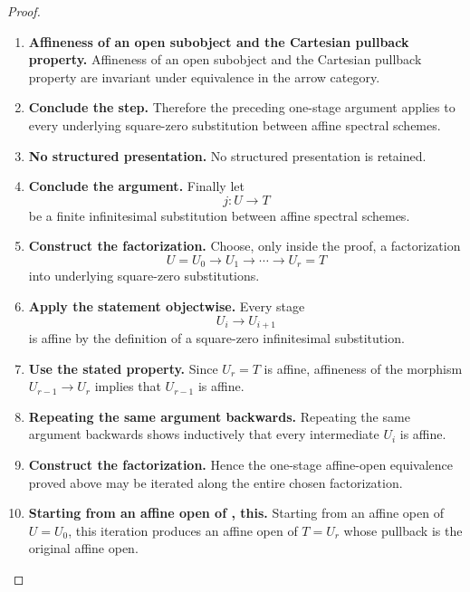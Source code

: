 \begin{proof}
\begin{enumerate}[label=\textup{(\arabic*)}]
    \item \textbf{Affineness of an open subobject and the Cartesian pullback property.}
    Affineness of an open subobject and the Cartesian pullback property are invariant under
    equivalence in the arrow category.

    \item \textbf{Conclude the step.}
    Therefore the preceding one-stage argument applies to every underlying square-zero
    substitution between affine spectral schemes.

    \item \textbf{No structured presentation.}
    No structured presentation is retained.

    \item \textbf{Conclude the argument.}
    Finally let
    \[
        j:U\longrightarrow T
    \]
    be a finite infinitesimal substitution between affine spectral schemes.

    \item \textbf{Construct the factorization.}
    Choose, only inside the proof, a factorization
    \[
        U=U_0
        \longrightarrow
        U_1
        \longrightarrow
        \cdots
        \longrightarrow
        U_r=T
    \]
    into underlying square-zero substitutions.

    \item \textbf{Apply the statement objectwise.}
    Every stage
    \[
        U_i\longrightarrow U_{i+1}
    \]
    is affine by the definition of a square-zero infinitesimal substitution.

    \item \textbf{Use the stated property.}
    Since \(U_r=T\) is affine, affineness of the morphism \(U_{r-1}\to U_r\) implies that \(U_{r-1}\)
    is affine.

    \item \textbf{Repeating the same argument backwards.}
    Repeating the same argument backwards shows inductively that every intermediate \(U_i\)
    is affine.

    \item \textbf{Construct the factorization.}
    Hence the one-stage affine-open equivalence proved above may be iterated along the entire
    chosen factorization.

    \item \textbf{Starting from an affine open of , this.}
    Starting from an affine open of \(U=U_0\), this iteration produces an affine open of
    \(T=U_r\) whose pullback is the original affine open.


\end{enumerate}
\end{proof}
